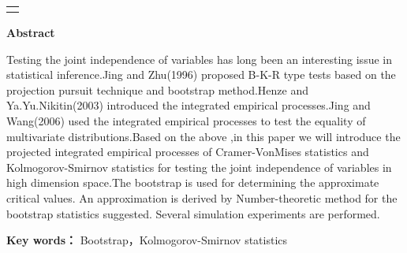 \par
\vspace{1cm}
\noindent\begin{tabular}{l}
\toprule[1pt]\hline
\hspace*{14.5cm}
\end{tabular}

\begin{center}
{\bf \Large Abstract}\\
\vskip 0.6cm
\end{center}
\par
Testing the joint independence of variables has long been an
interesting issue in statistical inference.Jing and Zhu(1996)
proposed  B-K-R type tests based on the projection pursuit technique
and bootstrap method.Henze and Ya.Yu.Nikitin(2003) introduced the
integrated empirical processes.Jing and Wang(2006) used the
integrated empirical processes to test the equality of multivariate
distributions.Based on the above ,in this paper we will introduce
the projected integrated empirical processes of Cramer-VonMises
statistics and Kolmogorov-Smirnov statistics for testing the joint
independence of variables in high dimension space.The bootstrap is
used for determining the approximate critical values. An
approximation is derived by Number-theoretic method for the
bootstrap statistics suggested. Several simulation experiments are
performed.
\medskip
\par

{\bf Key words：} Bootstrap，Kolmogorov-Smirnov statistics

\newpage 
\mbox{} 

